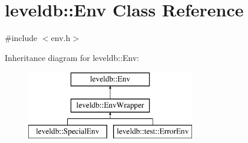 \hypertarget{classleveldb_1_1_env}{}\section{leveldb\+:\+:Env Class Reference}
\label{classleveldb_1_1_env}


{\ttfamily \#include $<$env.\+h$>$}

Inheritance diagram for leveldb\+:\+:Env\+:\begin{figure}[H]
\begin{center}
\leavevmode
\includegraphics[height=3.000000cm]{classleveldb_1_1_env}
\end{center}
\end{figure}
